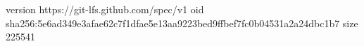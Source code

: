 version https://git-lfs.github.com/spec/v1
oid sha256:5e6ad349e3afae62c7f1dfae5e13aa9223bed9ffbef7fc0b04531a2a24dbc1b7
size 225541
